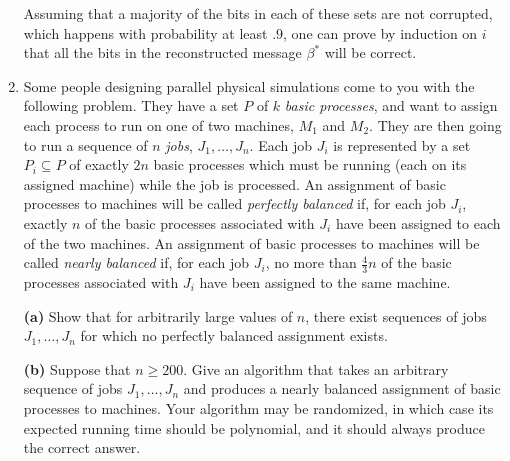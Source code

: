 \documentclass[12pt]{article}
\begin{document}
\begin{enumerate}
{Assuming that a majority of the bits in each of these sets
are not corrupted, which happens with probability at least $.9$,
one can prove by induction on $i$ that all the bits in
the reconstructed message $\beta^*$ will be correct.

}


\item

Some people designing parallel physical simulations
come to you with the following problem.
They have a set $P$ of $k$ {\em basic processes}, and
want to assign each process to run on one of two machines,
$M_1$ and $M_2$.
They are then going to run a sequence of $n$ {\em jobs},
$J_1, \ldots, J_n$.
Each job $J_i$ is represented by a set $P_i \subseteq P$
of exactly $2n$ basic processes which must
be running (each on its assigned machine) while the job is processed.
An assignment of basic processes to machines will be
called {\em perfectly balanced} if, for each job $J_i$,
exactly $n$ of the basic processes associated
with $J_i$ have been assigned to each of the two machines.
An assignment of basic processes to machines will be
called {\em nearly balanced} if, for each job $J_i$,
no more than $\frac43 n$ of the basic processes associated
with $J_i$ have been assigned to the same machine.

{\bf (a)} Show that for arbitrarily large values of $n$,
there exist sequences of jobs $J_1, \ldots, J_n$
for which no perfectly balanced assignment exists.

{\bf (b)} Suppose that $n \geq 200$.
Give an algorithm that takes an arbitrary sequence
of jobs $J_1, \ldots, J_n$ and produces a nearly balanced
assignment of basic processes to machines.
Your algorithm may be randomized, in which case its
expected running time should be polynomial, and it
should always produce the correct answer.

\end{enumerate}
\end{document}
